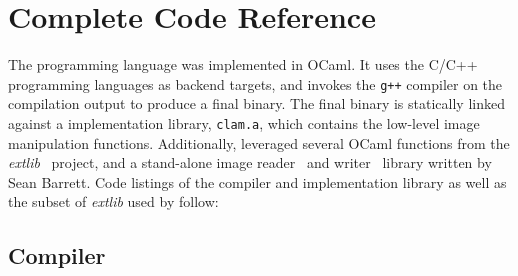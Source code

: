 \chapter{Complete Code Reference}
\label{chap:coderef}
The \sys{} programming language was implemented in OCaml. It uses the
C/C++ programming languages as backend targets, and invokes the \texttt{g++}
compiler on the \sys{} compilation output to produce a final binary. The
final binary is statically linked against a \sys{} implementation library,
\texttt{clam.a}, which contains the low-level image manipulation functions. Additionally,
\sys{} leveraged several OCaml functions from the \emph{extlib}~\cite{extlib:googlecode}
project, and a stand-alone image reader~\cite{stbimage:read} and writer~\cite{stbimage:write}
library written by Sean Barrett. Code listings of the \sys{} compiler and \sys{} implementation library
as well as the subset of \emph{extlib} used by \sys{} follow:

\clearpage
\section{\sys{} Compiler}
 \clearpage
 \clearpage
 \clearpage
 \clearpage
 \clearpage
 \clearpage
 \clearpage
 \clearpage
 \clearpage
 \clearpage
 \clearpage
 \clearpage
 \clearpage

